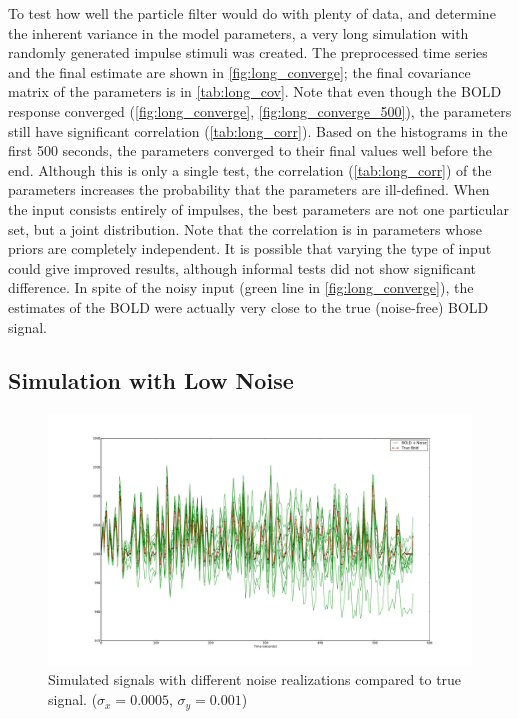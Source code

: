 To test how well the particle filter would do with plenty of data, and
determine the inherent variance in the model parameters, a very long simulation
with randomly generated impulse stimuli was created. The preprocessed time series
and the final estimate are shown in \autoref{fig:long_converge};
the final covariance matrix of the parameters is in \autoref{tab:long_cov}.
Note that even though the \ac{BOLD} response converged (\autoref{fig:long_converge},
\autoref{fig:long_converge_500}),
the parameters still have significant correlation (\autoref{tab:long_corr}).
Based on the histograms in the first 500 seconds, the parameters converged to
their final values well before the end.
Although this is only a single test, the correlation (\autoref{tab:long_corr})
of the parameters increases the probability that the parameters are
ill-defined. When the input
consists entirely of impulses, the best parameters are not one particular
set, but a joint distribution. Note that the correlation is in parameters whose priors
are completely independent. It is possible that varying the type of input could
give improved results, although informal tests did not show significant difference.
In spite of the noisy input (green line in \autoref{fig:long_converge}), the estimates
of the \ac{BOLD} were actually very close to the true (noise-free) \ac{BOLD} signal.

\subsection{Simulation with Low Noise}
\label{sec:SimLowNoise}
\begin{figure}
\centering
\includegraphics[clip=true,trim=6cm 2cm 5cm 3.5cm,width=15cm]{images/realization_lownoise}
\caption[Simulated Signal with Low Noise/Drift]
{Simulated signals with different noise realizations compared to true
signal. ($\sigma_x = 0.0005$, $\sigma_y = 0.001$)}
\label{fig:LowNoiseRealization}
\end{figure}

